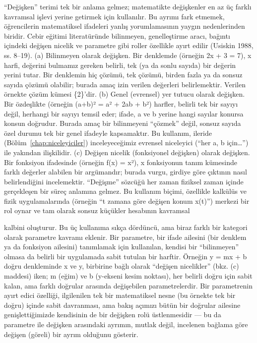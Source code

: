 “Değişken” terimi tek bir anlama gelmez; matematikte değişkenler en az üç farklı kavramsal işlevi yerine getirmek için kullanılır. Bu ayrımı fark etmemek, öğrencilerin matematiksel ifadeleri yanlış yorumlamasının yaygın nedenlerinden biridir. Cebir eğitimi literatüründe bilinmeyen, genelleştirme aracı, bağıntı içindeki değişen nicelik ve parametre gibi roller özellikle ayırt edilir (Usiskin 1988, ss. 8–19). (a) Bilinmeyen olarak değişken. Bir denklemde (örneğin 2x + 3 = 7), x harfi, değerini bulmamız gereken belirli, tek (ya da sonlu sayıda) bir değerin yerini tutar. Bir denklemin hiç çözümü, tek çözümü, birden fazla ya da sonsuz sayıda çözümü olabilir; burada amaç izin verilen değerleri belirlemektir. Verilen örnekte çözüm kümesi \{2\}’dir. (b) Genel (evrensel) yer tutucu olarak değişken. Bir özdeşlikte (örneğin (a+b)² = a² + 2ab + b²) harfler, belirli tek bir sayıyı değil, herhangi bir sayıyı temsil eder; ifade, a ve b yerine hangi sayılar konursa konsun doğrudur. Burada amaç bir bilinmeyeni “çözmek” değil, sonsuz sayıda özel durumu tek bir genel ifadeyle kapsamaktır. Bu kullanım, ileride (Bölüm~\ref{chap:niceleyiciler}) inceleyeceğimiz evrensel niceleyici (“her a, b için…”) ile yakından ilişkilidir. (c) Değişen nicelik (fonksiyonel değişken) olarak değişken. Bir fonksiyon ifadesinde (örneğin f(x) = x²), x fonksiyonun tanım kümesinde farklı değerler alabilen bir argümandır; burada vurgu, girdiye göre çıktının nasıl belirlendiğini incelemektir. “Değişme” sözcüğü her zaman fiziksel zaman içinde gerçekleşen bir süreç anlamına gelmez. Bu kullanım biçimi, özellikle kalkülüs ve fizik uygulamalarında (örneğin “t zamana göre değişen konum x(t)”) merkezi bir rol oynar ve tam olarak sonsuz küçükler hesabının kavramsal

kalbini oluşturur. Bu üç kullanıma sıkça dördüncü, ama biraz farklı bir kategori olarak parametre kavramı eklenir. Bir parametre, bir ifade ailesini (bir denklem ya da fonksiyon ailesini) tanımlamak için kullanılan, kendisi bir “bilinmeyen” olmasa da belirli bir uygulamada sabit tutulan bir harftir. Örneğin y = mx + b doğru denkleminde x ve y, birbirine bağlı olarak “değişen nicelikler” (bkz. (c) maddesi) iken; m (eğim) ve b (y-ekseni kesim noktası), her belirli doğru için sabit kalan, ama farklı doğrular arasında değişebilen parametrelerdir. Bir parametrenin ayırt edici özelliği, ilgilenilen tek bir matematiksel nesne (bu örnekte tek bir doğru) içinde sabit davranması, ama bakış açımızı bütün bir doğrular ailesine genişlettiğimizde kendisinin de bir değişken rolü üstlenmesidir — bu da parametre ile değişken arasındaki ayrımın, mutlak değil, incelenen bağlama göre değişen (göreli) bir ayrım olduğunu gösterir.

